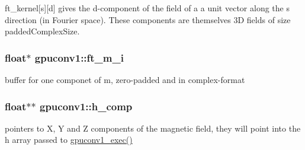 ft\_\-kernel\mbox{[}s\mbox{]}\mbox{[}d\mbox{]} gives the d-\/component of the field of a a unit vector along the s direction (in Fourier space). These components are themselves 3D fields of size paddedComplexSize. 

\hypertarget{structgpuconv1_a8fb89a2ea5777cad81dc9bc2701eed2a}{
\subsubsection[{ft\_\-m\_\-i}]{\setlength{\rightskip}{0pt plus 5cm}float$\ast$ {\bf gpuconv1::ft\_\-m\_\-i}}}
\label{structgpuconv1_a8fb89a2ea5777cad81dc9bc2701eed2a}


buffer for one componet of m, zero-\/padded and in complex-\/format 

\hypertarget{structgpuconv1_ad52d94894299e1553a8c8642be29172a}{
\subsubsection[{h\_\-comp}]{\setlength{\rightskip}{0pt plus 5cm}float$\ast$$\ast$ {\bf gpuconv1::h\_\-comp}}}
\label{structgpuconv1_ad52d94894299e1553a8c8642be29172a}


pointers to X, Y and Z components of the magnetic field, they will point into the h array passed to \hyperlink{gpuconv1_8h_a290a0200b1639a156c1767f74bf5b94e}{gpuconv1\_\-exec()} 

